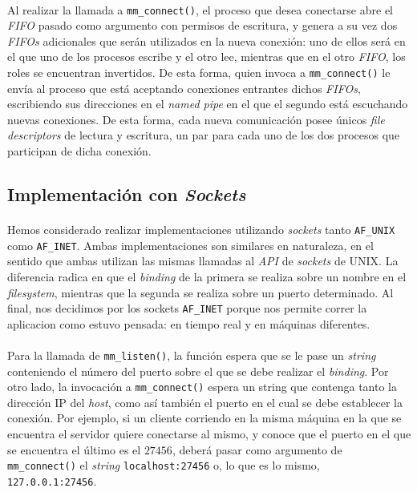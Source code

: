 \documentclass[spanish]{article}
\begin{document}
\paragraph{} Al realizar la llamada a \verb|mm_connect()|, el proceso que desea conectarse abre el \textit{FIFO} pasado como argumento con permisos de escritura, y genera a su vez dos \textit{FIFOs} adicionales que serán utilizados en la nueva conexión: uno de ellos será en el que uno de los procesos escribe y el otro lee, mientras que en el otro \textit{FIFO}, los roles se encuentran invertidos. De esta forma, quien invoca a \verb|mm_connect()| le envía al proceso que está aceptando conexiones entrantes dichos \textit{FIFOs}, escribiendo sus direcciones en el \textit{named pipe} en el que el segundo está escuchando nuevas conexiones. De esta forma, cada nueva comunicación posee únicos \textit{file descriptors} de lectura y escritura, un par para cada uno de los dos procesos que participan de dicha conexión.
\subsection{Implementación con \textit{Sockets}}
\paragraph{} Hemos considerado realizar implementaciones utilizando \textit{sockets} tanto \verb|AF_UNIX| como \verb|AF_INET|. Ambas implementaciones son similares en naturaleza, en el sentido que ambas utilizan las mismas llamadas al \textit{API} de \textit{sockets} de UNIX. La diferencia radica en que el \textit{binding} de la primera se realiza sobre un nombre en el \textit{filesystem}, mientras que la segunda se realiza sobre un puerto determinado. Al final, nos decidimos por los sockets \verb|AF_INET| porque nos permite correr la aplicacion como estuvo pensada: en tiempo real y en máquinas diferentes.

\paragraph{}  Para la llamada de \verb|mm_listen()|, la función espera que se le pase un \textit{string} conteniendo el número del puerto sobre el que se debe realizar el \textit{binding}. Por otro lado, la invocación a \verb|mm_connect()| espera un string que contenga tanto la dirección IP del \textit{host}, como así también el puerto en el cual se debe establecer la conexión. Por ejemplo, si un cliente corriendo en la misma máquina en la que se encuentra el servidor quiere conectarse al mismo, y conoce que el puerto en el que se encuentra el último es el $27456$, deberá pasar como argumento de \verb|mm_connect()| el \textit{string} \verb|localhost:27456| o, lo que es lo mismo, \verb|127.0.0.1:27456|. 
\end{document}
